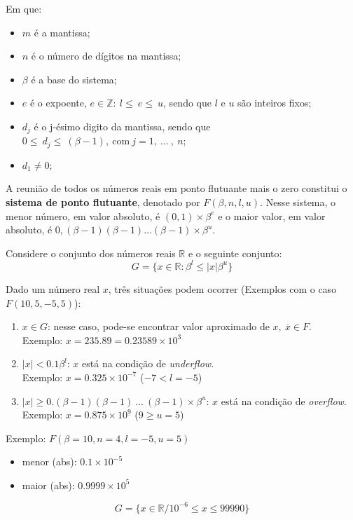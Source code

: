 \documentclass{article}
\begin{document}
        Em que:
        \begin{itemize}
            \item $m$ é a mantissa;
            \item $n$ é o número de dígitos na mantissa;
            \item $\beta$ é a base do sistema;
            \item $e$ é o expoente, $e \in \mathbb{Z}:~l\leq~e\leq~u$, sendo que $l$ e $u$ são inteiros fixos;
            \item $d_j$ é o j-ésimo digito da mantissa, sendo que $0\leq~d_j\leq~(\beta - 1),~\textrm{com}~j = 1,~\ldots~,~n$;
            \item $d_1 \neq 0$;
        \end{itemize}

        A reunião de todos os números reais em ponto flutuante mais o zero constitui o \textbf{sistema de ponto flutuante}, denotado por $F(\beta, n, l, u)$. Nesse sistema, o menor número, em valor absoluto, é $(0,1)\times\beta^e$ e o maior valor, em valor absoluto, é $0,(\beta-1)(\beta-1)\ldots(\beta-1)\times\beta^u$. %

        Considere o conjunto dos números reais $\mathbb{R}$ e o seguinte conjunto:
        \[G = \{x \in \mathbb{R} : {\beta}^l \leq |x| {\beta}^u\}\]

        Dado um número real $x$, três situações podem ocorrer (Exemplos com o caso $F(10, 5, -5, 5)$):

        \begin{enumerate}
                \item $x \in G$: nesse caso, pode-se encontrar valor aproximado de $x,~\overline{x} \in F$.\\
                    Exemplo: $x = 235.89 = 0.23589 \times 10^3$
                \item $|x| < 0.1\beta^l$: $x$ está na condição de \textit{underflow}.\\
                    Exemplo: $x = 0.325 \times 10^{-7}$ ($-7 < l = -5$)
                \item $|x| \ge 0.(\beta-1)(\beta-1)~\ldots~(\beta-1) \times \beta^u$: $x$ está na condição de \textit{overflow}.\\
                    Exemplo: $x = 0.875 \times 10^{\underline{9}}$ ($9 \ge u = 5$)
        \end{enumerate}

        Exemplo: $F(\beta = 10, n = 4, l = -5, u = 5)$
        \begin{itemize}
                \item menor (abs): $0.1 \times 10^{-5}$
                \item maior (abs): $0.9999 \times 10^{5}$
        \end{itemize}
        \[G = \{x \in \mathbb{R} / 10^{-6} \leq x \leq 99990\}\]
\end{document}
